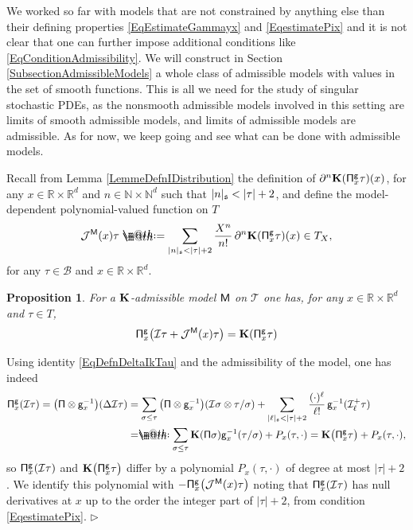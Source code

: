 \documentclass[10pt, reqno]{amsart}
\makeatletter
\numberwithin{subsection}{section}
\numberwithin{subsubsection}{subsection}
\numberwithin{equation}{section} %
\newenvironment{Dem}[1][\unskip]{%
    \begin{list}{\hspace{1.15cm}{\sf \textbf{{\small Proof #1 --}}}}{%
        \setlength{\topsep}{0pt}%
        \setlength{\leftmargin}{0pt}%
        \setlength{\rightmargin}{0pt}%
        \setlength{\listparindent}{0pt}%
        \setlength{\itemindent}{0pt}%
        \setlength{\parsep}{0pt}%
        \addtolength{\leftmargin}{0pt}%
        \addtolength{\rightmargin}{0pt}%
    } \item }{\hfill $\rhd$\end{list}\smallskip}
\theoremstyle{mystyle}
\newtheorem{prop}[thm]{\hspace{-0.13cm} {Proposition}}%
\theoremstyle{mystyle2}
\theoremstyle{mystyle3}
\newcommand{\ssk}{\smallskip}
\newcommand\bbN{\mathbb{N}}
\newcommand\bbR{\mathbb{R}}
\newcommand{\mcB}{\mathcal{B}}
\newcommand{\mcI}{\mathcal{I}}
\newcommand{\mcJ}{\mathcal{J}}
\newcommand*{\defeq}{\mathrel{\rlap{%
                     \raisebox{0.3ex}{$\m@th\cdot$}}%
                     \raisebox{-0.3ex}{$\m@th\cdot$}}%
                     =}
\newcommand*{\eqdef}{=\mathrel{\rlap{%
                     \raisebox{0.3ex}{$\m@th\cdot$}}%
                     \raisebox{-0.3ex}{$\m@th\cdot$}}%
                     }
\makeatother
\begin{document}
\ssk

We worked so far with models that are not constrained by anything else than their defining properties \eqref{EqEstimateGammayx} and \eqref{EqestimatePix} and it is not clear that one can further impose additional conditions like \eqref{EqConditionAdmissibility}. We will construct in Section \ref{SubsectionAdmissibleModels} a whole class of admissible models with values in the set of smooth functions. This is all we need for the study of singular stochastic PDEs, as the nonsmooth admissible models involved in this setting are limits of smooth admissible models, and limits of admissible models are admissible. As for now, we keep going and see what can 
be done with admissible models.

\medskip

Recall from Lemma \ref{LemmeDefnIDistribution} the definition of $\partial^n {\bf K}({\sf\Pi}^{\sf g}_x\tau)(x)$, for any $x\in\bbR\times\bbR^d$ 
and $n\in\bbN\times\bbN^d$ such that $\vert n\vert_\frak{s}<\vert\tau\vert+2$, and define the model-dependent polynomial-valued function on $T$
$$
\mcJ^{\sf M}(x)\tau \defeq  \sum_{|n|_\frak{s}<|\tau|+2} \frac{X^n}{n!} \,\partial^n {\bf K}({\sf\Pi}^{\sf g}_x\tau)(x) \in T_X,
$$
for any $\tau\in\mcB$ and $x\in\bbR\times\bbR^d$.

\medskip

\begin{prop} \label{PropUsefulJx}
For a $\bf K$-admissible model $\sf M$ on $\mathscr{T}$ one has, for any $x\in\bbR\times\bbR^d$ and $\tau\in T$,
$$
{\sf \Pi}^{\sf g}_x\big(\mcI\tau + \mcJ^{\sf M}(x)\tau\big) = {\bf K}({\sf \Pi}^{\sf g}_x\tau)
$$
\end{prop}

\medskip

\begin{Dem} 
Using identity \eqref{EqDefnDeltaIkTau} and the admissibility of the model, one has indeed
\begin{equation*} \begin{split}
{\sf \Pi}^{\sf g}_x(\mcI\tau) = \big({\sf \Pi}\otimes {\sf g}_x^{-1}\big)(\Delta\mcI\tau) &= \sum_{\sigma\leq\tau} \big({\sf \Pi}\otimes {\sf g}_x^{-1}\big) (\mcI\sigma\otimes\tau/\sigma) + \sum_{\vert\ell\vert_{\frak{s}}<\vert\tau\vert+2} \frac{(\cdot)^\ell}{\ell!}\,{\sf g}_x^{-1}(\mcI^+_\ell\tau)   \\
&\eqdef \sum_{\sigma\leq\tau} {\bf K}({\sf \Pi}\sigma){\sf g}_x^{-1}(\tau/\sigma) + P_x(\tau, \cdot) = {\bf K}\big({\sf \Pi}_x^{\sf g}\tau\big) + P_x(\tau, \cdot),
\end{split} \end{equation*}
so ${\sf \Pi}^{\sf g}_x(\mcI\tau)$ and ${\bf K}\big({\sf \Pi}_x^{\sf g}\tau\big)$ differ by a polynomial $P_x(\tau, \cdot)$ of degree at most $\vert\tau\vert+2$. We identify this polynomial with $-{\sf \Pi}_x^{\sf g}\big(\mcJ^{\sf M}(x)\tau\big)$ noting that ${\sf \Pi}^{\sf g}_x(\mcI\tau)$ has null derivatives at $x$ up to the order the integer part of $\vert\tau\vert+2$, from condition \eqref{EqestimatePix}.
\end{Dem}
\end{document}
